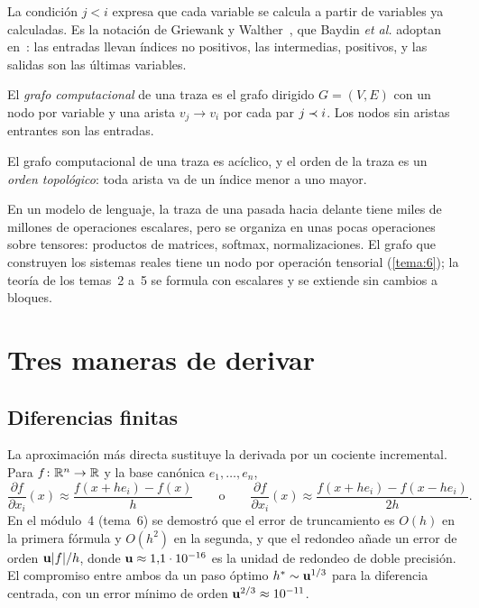 La condición $j<i$ expresa que cada variable se calcula a partir de variables ya calculadas. Es la notación de Griewank y Walther~\cite[cap.~2]{gw}, que Baydin \emph{et al.} adoptan en~\cite[§3]{baydin}: las entradas llevan índices no positivos, las intermedias, positivos, y las salidas son las últimas variables.

\begin{definicion}\label{def:grafo}
El \emph{grafo computacional} de una traza es el grafo dirigido $G=(V,E)$ con un nodo por variable y una arista $v_j\to v_i$ por cada par $j\prec i$. Los nodos sin aristas entrantes son las entradas.
\end{definicion}

\begin{proposicion}\label{prop:aciclico}
El grafo computacional de una traza es acíclico, y el orden de la traza es un \emph{orden topológico}: toda arista va de un índice menor a uno mayor.
\end{proposicion}

\addtocounter{definicion}{1}%

\addtocounter{figure}{1}%

\begin{observacion}
En un modelo de lenguaje, la traza de una pasada hacia delante tiene miles de millones de operaciones escalares, pero se organiza en unas pocas operaciones sobre tensores: productos de matrices, softmax, normalizaciones. El grafo que construyen los sistemas reales tiene un nodo por operación tensorial (\cref{tema:6}); la teoría de los temas~2 a~5 se formula con escalares y se extiende sin cambios a bloques.
\end{observacion}

\section{Tres maneras de derivar}

\subsection{Diferencias finitas}

La aproximación más directa sustituye la derivada por un cociente incremental. Para $f\colon\mathbb{R}^{n}\to\mathbb{R}$ y la base canónica $e_1,\dots,e_n$,
\[
\frac{\partial f}{\partial x_i}(x)\approx\frac{f(x+he_i)-f(x)}{h}
\qquad\text{o}\qquad
\frac{\partial f}{\partial x_i}(x)\approx\frac{f(x+he_i)-f(x-he_i)}{2h}.
\]
En el módulo~4 (tema~6) se demostró que el error de truncamiento es $O(h)$ en la primera fórmula y $O(h^{2})$ en la segunda, y que el redondeo añade un error de orden $\mathbf{u}\lvert f\rvert/h$, donde $\mathbf{u}\approx 1{,}1\cdot 10^{-16}$ es la unidad de redondeo de doble precisión. El compromiso entre ambos da un paso óptimo $h^{*}\sim\mathbf{u}^{1/3}$ para la diferencia centrada, con un error mínimo de orden $\mathbf{u}^{2/3}\approx 10^{-11}$.

